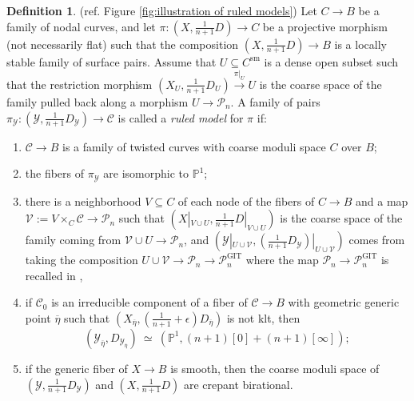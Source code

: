 \documentclass[a4paper,12pt]{amsart}
\newcommand{\ove}[1]{\overline{#1}}
\newcommand{\mts}[1]{\mathscr{#1}}
\DeclareMathOperator{\GIT}{GIT}
\DeclareMathOperator{\sm}{sm}
\newcommand{\bP}{{\mathbb P}}
\newcommand{\sY}{{\mathscr{Y}}}
\newcommand{\sP}{{\mathscr{P}}}
\newcommand{\sC}{{\mathscr{C}}}
\newcommand{\sV}{{\mathscr{V}}}
\theoremstyle{definition}
\newtheorem{defn}[theorem]{Definition}
\theoremstyle{remark}
\begin{document}
\begin{defn}\label{defn:ruled model} (ref. Figure \ref{fig:illustration of ruled models})
    Let $C\to B$ be a family of nodal curves, and let $\pi\colon(X,\frac{1}{n+1}D)\to C$ be a projective morphism (not necessarily flat) such that the composition $(X,\frac{1}{n+1}D)\to B$ is a locally stable family of surface pairs. Assume that $U\subseteq C^{\sm}$ is a dense open subset such that the restriction morphism $(X_U,\frac{1}{n+1}D_U)\xrightarrow{\pi|_U} U$ is the coarse space of the family pulled back along a morphism $U\to \sP_n$. A family of pairs $\pi_\sY\colon(\sY,\frac{1}{n+1}D_\sY)\to \sC$ is called a \textit{ruled model} for $\pi$ if:
    \begin{enumerate}
        \item $\sC\to B$ is a family of twisted curves with coarse moduli space $C$ over $B$;
        \item the fibers of $\pi_\sY$ are isomorphic to $\bP^1$;
        \item there is a neighborhood $V\subseteq C$ of each node of the fibers of $C\to B$ and a map $\mts{V}:=V\times_C\sC\to \sP_n$ such that $(X|_{V\cup U},\frac{1}{n+1}D|_{V\cup U})$ is the coarse space of the family coming from $\mathscr{V}\cup U\to \sP_n$, and $(\sY|_{U\cup \sV},(\frac{1}{n+1}D_{\sY})|_{U\cup \sV})$ comes from taking the composition ${U\cup \mathscr{V}}\to \sP_n\to \sP_n^{\GIT}$ where the map $\sP_n\to\sP_n^{\GIT}$ is recalled in ,
        \item if $\sC_0$ is an irreducible component of a fiber of $\sC\rightarrow B$ with geometric generic point $\ove{\eta}$ such that
        $(X_{\ove{\eta}},(\frac{1}{n+1}+\epsilon)D_{\ove{\eta}})$ is not klt, then
        $$\textstyle (\sY_{\ove{\eta}},D_{\sY_{\ove{\eta}}})\ \simeq \ (\bP^1,(n+1)[0]+(n+1)[\infty]);$$
        \item if the generic fiber of $X\to B$ is smooth, then the coarse moduli space of $(\sY,\frac{1}{n+1}D_\sY)$ and $(X,\frac{1}{n+1}D)$ are crepant birational.
    \end{enumerate}
\end{defn}
\end{document}
